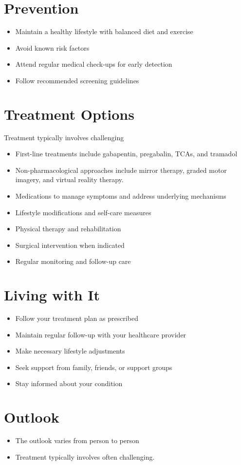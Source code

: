 \section{Prevention}
\begin{itemize}[noitemsep]
  \item Maintain a healthy lifestyle with balanced diet and exercise
  \item Avoid known risk factors
  \item Attend regular medical check-ups for early detection
  \item Follow recommended screening guidelines
\end{itemize}
\section{Treatment Options}
Treatment typically involves challenging

\begin{itemize}[noitemsep]
  \item First-line treatments include gabapentin, pregabalin, TCAs, and tramadol
  \item Non-pharmacological approaches include mirror therapy, graded motor imagery, and virtual reality therapy.
  \item Medications to manage symptoms and address underlying mechanisms
  \item Lifestyle modifications and self-care measures
  \item Physical therapy and rehabilitation
  \item Surgical intervention when indicated
  \item Regular monitoring and follow-up care
\end{itemize}
\section{Living with It}
\begin{itemize}[noitemsep]
  \item Follow your treatment plan as prescribed
  \item Maintain regular follow-up with your healthcare provider
  \item Make necessary lifestyle adjustments
  \item Seek support from family, friends, or support groups
  \item Stay informed about your condition
\end{itemize}
\section{Outlook}
\begin{itemize}[noitemsep]
  \item The outlook varies from person to person
  \item Treatment typically involves often challenging.
\end{itemize}
